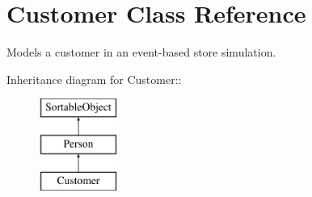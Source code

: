 \hypertarget{class_customer}{
\section{Customer Class Reference}
\label{class_customer}
}
Models a customer in an event-based store simulation.  


Inheritance diagram for Customer::\begin{figure}[H]
\begin{center}
\leavevmode
\includegraphics[height=3cm]{class_customer}
\end{center}
\end{figure}
